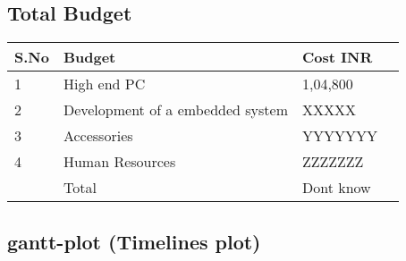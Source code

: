 \documentclass{FR16}
\begin{document}
\subsection{Total Budget}
\begin{center}
\begin{tabular}{||p{3 cm} ||p{4 cm}|| p{6 cm}|| c|| }
\arrayrulecolor{Azzurro}
\hline
\hline
{\bfseries S.No} & {\bfseries Budget}&  {\bfseries Cost INR} \\
\hline
\hline

1& High end PC& 1,04,800\\
\hline
\hline
2& Development of a embedded system & XXXXX\\
\hline
\hline
3&Accessories &YYYYYYY\\
\hline
\hline
4&Human Resources & ZZZZZZZ\\
\hline
\hline
& Total & Dont know
\end{tabular}
\end{center}


\subsection{gantt-plot (Timelines plot)}









 
\end{document}
